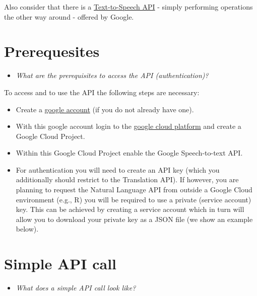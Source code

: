 \documentclass[
]{book}
\providecommand{\tightlist}{%
  \setlength{\itemsep}{0pt}\setlength{\parskip}{0pt}}
\begin{document}
Also consider that there is a \href{\%22https://cloud.google.com/text-to-speech\%22}{Text-to-Speech API} - simply performing operations the other way around - offered by Google.

\hypertarget{prerequesites-4}{%
\section{Prerequesites}\label{prerequesites-4}}

\begin{itemize}
\tightlist
\item
  \emph{What are the prerequisites to access the API (authentication)? }
\end{itemize}

To access and to use the API the following steps are necessary:

\begin{itemize}
\item
  Create a \href{\%22https://www.google.com/account/about/\%22}{google account} (if you do not already have one).
\item
  With this google account login to the \href{\%22https://cloud.google.com/\%22}{google cloud platform} and create a Google Cloud Project.
\item
  Within this Google Cloud Project enable the Google Speech-to-text API.
\item
  For authentication you will need to create an API key (which you additionally should restrict to the Translation API). If however, you are planning to request the Natural Language API from outside a Google Cloud environment (e.g., R) you will be required to use a private (service account) key. This can be achieved by creating a service account which in turn will allow you to download your private key as a JSON file (we show an example below).
\end{itemize}

\hypertarget{simple-api-call-4}{%
\section{Simple API call}\label{simple-api-call-4}}

\begin{itemize}
\tightlist
\item
  \emph{What does a simple API call look like?}
\end{itemize}
\end{document}
